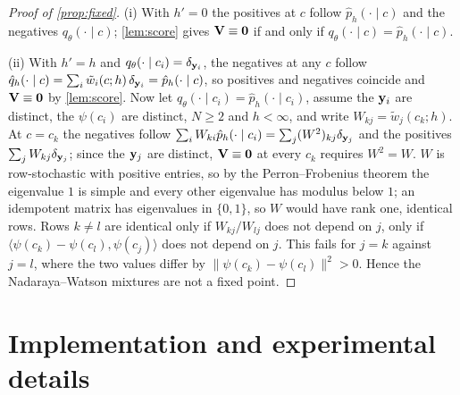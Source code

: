\begin{proof}[Proof of \cref{prop:fixed}]
(i) With $h'=0$ the positives at $c$ follow $\hat p_h(\cdot\mid c)$ and the negatives $q_\theta(\cdot\mid c)$;
\cref{lem:score} gives $\mathbf{V}\equiv\mathbf 0$ if and only if $q_\theta(\cdot\mid c)=\hat p_h(\cdot\mid c)$.

(ii) With $h'=h$ and $q_\theta(\cdot\mid c_i)=\delta_{\mathbf{y}_i}$, the negatives at any $c$ follow
$\hat q_h(\cdot\mid c)=\sum_i\tilde w_i(c;h)\,\delta_{\mathbf{y}_i}=\hat p_h(\cdot\mid c)$, so positives and negatives coincide
and $\mathbf{V}\equiv\mathbf 0$ by \cref{lem:score}. Now let $q_\theta(\cdot\mid c_i)=\hat p_h(\cdot\mid c_i)$, assume the
$\mathbf{y}_i$ are distinct, the $\psi(c_i)$ are distinct, $N\ge2$ and $h<\infty$, and write $W_{kj}=\tilde w_j(c_k;h)$. At
$c=c_k$ the negatives follow $\sum_i W_{ki}\hat p_h(\cdot\mid c_i)=\sum_j(W^2)_{kj}\delta_{\mathbf{y}_j}$ and the positives
$\sum_jW_{kj}\delta_{\mathbf{y}_j}$; since the $\mathbf{y}_j$ are distinct, $\mathbf{V}\equiv\mathbf 0$ at every $c_k$ requires $W^2=W$. $W$ is
row-stochastic with positive entries, so by the Perron--Frobenius theorem the eigenvalue $1$ is simple and every other
eigenvalue has modulus below $1$; an idempotent matrix has eigenvalues in $\{0,1\}$, so $W$ would have rank one, \ie
identical rows. Rows $k\neq l$ are identical only if $W_{kj}/W_{lj}$ does not depend on $j$, \ie only if
$\langle\psi(c_k)-\psi(c_l),\psi(c_j)\rangle$ does not depend on $j$. This fails for $j=k$ against $j=l$, where the two
values differ by $\lVert\psi(c_k)-\psi(c_l)\rVert^2>0$. Hence the Nadaraya--Watson mixtures are not a fixed point.
\end{proof}

\section{Implementation and experimental details}
\label{app:impl}

